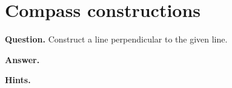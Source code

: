 \documentclass{article}
\begin{document}
\section*{Compass constructions}
\textbf{Question.} Construct a line perpendicular to the given line.

\textbf{Answer.} 

\textbf{Hints.}
\begin{itemize}

\end{itemize}
\end{document}
